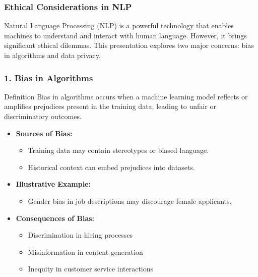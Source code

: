 \documentclass[aspectratio=169]{beamer}
\begin{document}
\begin{frame}[fragile]
    \frametitle{Ethical Considerations in NLP}
    Natural Language Processing (NLP) is a powerful technology that enables machines to understand and interact with human language. However, it brings significant ethical dilemmas. This presentation explores two major concerns: bias in algorithms and data privacy.
\end{frame}

\begin{frame}[fragile]
    \frametitle{1. Bias in Algorithms}
    \begin{block}{Definition}
        Bias in algorithms occurs when a machine learning model reflects or amplifies prejudices present in the training data, leading to unfair or discriminatory outcomes.
    \end{block}

    \begin{itemize}
        \item \textbf{Sources of Bias:}
            \begin{itemize}
                \item Training data may contain stereotypes or biased language.
                \item Historical context can embed prejudices into datasets.
            \end{itemize}
        
        \item \textbf{Illustrative Example:}
            \begin{itemize}
                \item Gender bias in job descriptions may discourage female applicants.
            \end{itemize}
        
        \item \textbf{Consequences of Bias:}
            \begin{itemize}
                \item Discrimination in hiring processes
                \item Misinformation in content generation
                \item Inequity in customer service interactions
            \end{itemize}
    \end{itemize}
\end{frame}
\end{document}

